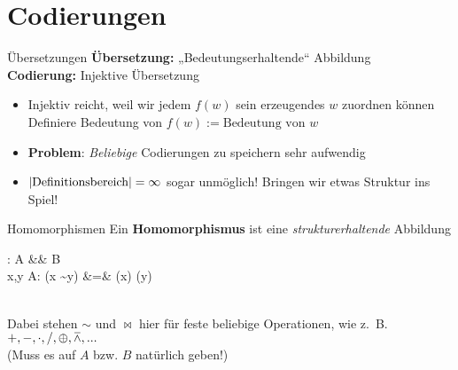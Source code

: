 \section{Codierungen}

\begin{frame}{Übersetzungen}
	\textbf{Übersetzung:} „Bedeutungserhaltende“ Abbildung \\[0.5em] \pause
	\textbf{Codierung:} Injektive Übersetzung \\ \pause
	\begin{itemize}
		\item Injektiv reicht, weil wir jedem $f(w)$ sein erzeugendes $w$ zuordnen können
		\implitem Definiere Bedeutung von $f(w) := \text{Bedeutung von } w$
	\end{itemize}
	
	\pause
	\begin{itemize}
		\item \textbf{Problem}: \emph{Beliebige} Codierungen zu speichern sehr aufwendig
		\item $\left\lvert \text{Definitionsbereich} \right\rvert = \infty$ \impl sogar unmöglich!
		\implitem Bringen wir etwas Struktur ins Spiel!
	\end{itemize}
\end{frame}

\begin{frame}{Homomorphismen}
	Ein \textbf{Homomorphismus} ist eine \textit{strukturerhaltende} Abbildung \\ \pause
	\begin{threealign}
		\Phi : A &\functionto& B \\
		 \forall x,y \in A: \quad  \Phi(x \sim y) &=& \Phi(x) \bowtie \Phi(y)
	\end{threealign}
	\medskip \\
	Dabei stehen $\sim$ und $\bowtie$ hier für feste beliebige Operationen, wie z.~B. $+, -, \cdot, /, \oplus, \barwedge, ...$ \\
	(Muss es auf $A$ bzw. $B$ natürlich geben!)
\end{frame}

